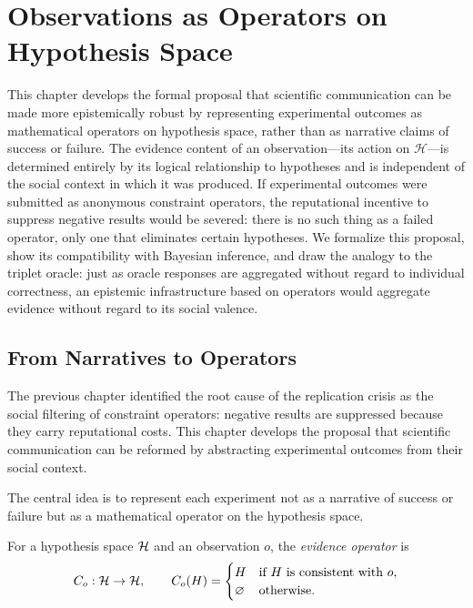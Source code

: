 \chapter{Observations as Operators on Hypothesis Space}
\label{ch:operators}

This chapter develops the formal proposal that scientific communication can be made more epistemically robust by representing experimental outcomes as mathematical operators on hypothesis space, rather than as narrative claims of success or failure. The evidence content of an observation---its action on $\mathcal{H}$---is determined entirely by its logical relationship to hypotheses and is independent of the social context in which it was produced. If experimental outcomes were submitted as anonymous constraint operators, the reputational incentive to suppress negative results would be severed: there is no such thing as a failed operator, only one that eliminates certain hypotheses. We formalize this proposal, show its compatibility with Bayesian inference, and draw the analogy to the triplet oracle: just as oracle responses are aggregated without regard to individual correctness, an epistemic infrastructure based on operators would aggregate evidence without regard to its social valence.



\section{From Narratives to Operators}

The previous chapter identified the root cause of the replication crisis as the social filtering of constraint operators: negative results are suppressed because they carry reputational costs. This chapter develops the proposal that scientific communication can be reformed by abstracting experimental outcomes from their social context.

The central idea is to represent each experiment not as a narrative of success or failure but as a mathematical operator on the hypothesis space.

\begin{definition}
For a hypothesis space $\mathcal{H}$ and an observation $o$, the \emph{evidence operator} is
\[
C_o : \mathcal{H} \to \mathcal{H}, \qquad
C_o(H) = \begin{cases} H & \text{if } H \text{ is consistent with } o, \\ \varnothing & \text{otherwise.} \end{cases}
\]
\end{definition}

